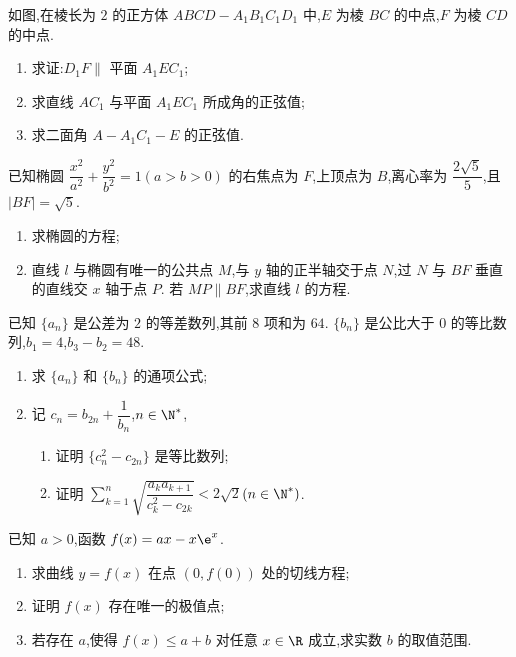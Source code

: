 \begin{problem}
如图,在棱长为 \( 2 \) 的正方体 \( ABCD-A_1B_1C_1D_1 \) 中,\(E\) 为棱 \(BC\) 的中点,\(F\) 为棱 \(CD\) 的中点.

\begin{enumerate}
\item 求证:\( D_1F\parallel \) 平面 \(A_1EC_1\);
\item 求直线 \(AC_1\) 与平面 \(A_1EC_1\) 所成角的正弦值;
\item 求二面角 \( A-A_1C_1-E \) 的正弦值.
\end{enumerate}

\end{problem}

\begin{problem}
已知椭圆 \( \dfrac{x^2}{a^2}+\dfrac{y^2}{b^2}=1 \)\( \left( a>b>0 \right) \) 的右焦点为 \(F\),上顶点为 \(B\),离心率为 \( \dfrac{2\sqrt5}{5} \),且 \( |BF|=\sqrt5 \).

\begin{enumerate}
\item 求椭圆的方程;
\item 直线 \( l \) 与椭圆有唯一的公共点 \(M\),与 \( y \) 轴的正半轴交于点 \(N\),过 \(N\) 与 \(BF\) 垂直的直线交 \( x \) 轴于点 \(P\). 若 \( MP\parallel BF \),求直线 \( l \) 的方程.
\end{enumerate}
\end{problem}

\begin{problem}
已知 \( \{a_n\} \) 是公差为 \( 2 \) 的等差数列,其前 \( 8 \) 项和为 \( 64 \). \( \{b_n\} \) 是公比大于 \( 0 \) 的等比数列,\( b_1=4 \),\( b_3-b_2=48 \).

\begin{enumerate}
\item 求 \( \{a_n\} \) 和 \( \{b_n\} \) 的通项公式;
\item 记 \( c_n=b_{2n}+\dfrac{1}{b_n} \),\( n\in \N^* \),
\begin{enumerate}
\item 证明 \( \{c_n^2-c_{2n}\} \) 是等比数列;
\item 证明 \( \sum_{k=1}^n \sqrt{\dfrac{a_ka_{k+1}}{c_k^2-c_{2k}}}<2\sqrt2 \)\( \left( n\in \N^* \right) \).
\end{enumerate}
\end{enumerate}
\end{problem}

\begin{problem}
已知 \( a>0 \),函数 \( f(x)=ax-x\e^x \).

\begin{enumerate}
\item 求曲线 \( y=f(x) \) 在点 \( \left( 0,f(0) \right) \) 处的切线方程;
\item 证明 \( f(x) \) 存在唯一的极值点;
\item 若存在 \( a \),使得 \( f(x)\le a+b \) 对任意 \( x\in \R \) 成立,求实数 \( b \) 的取值范围.
\end{enumerate}
\end{problem}

